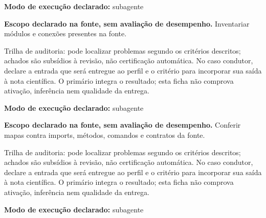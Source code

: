 \begin{arquitetura}
\textbf{Modo de execução declarado:} subagente
\end{arquitetura}


\begin{descricao}
\textbf{Escopo declarado na fonte, sem avaliação de desempenho.}
Inventariar módulos e conexões presentes na fonte.
\end{descricao}

\begin{funcao}
Trilha de auditoria: pode localizar problemas segundo os critérios descritos; achados são subsídios à revisão, não certificação automática. No caso condutor, declare a entrada que será entregue ao perfil e o critério para incorporar sua saída à nota científica. O primário integra o resultado; esta ficha não comprova ativação, inferência nem qualidade da entrega.
\end{funcao}

\begin{arquitetura}
\textbf{Modo de execução declarado:} subagente
\end{arquitetura}


\begin{descricao}
\textbf{Escopo declarado na fonte, sem avaliação de desempenho.}
Conferir mapas contra imports, métodos, comandos e contratos da fonte.
\end{descricao}

\begin{funcao}
Trilha de auditoria: pode localizar problemas segundo os critérios descritos; achados são subsídios à revisão, não certificação automática. No caso condutor, declare a entrada que será entregue ao perfil e o critério para incorporar sua saída à nota científica. O primário integra o resultado; esta ficha não comprova ativação, inferência nem qualidade da entrega.
\end{funcao}

\begin{arquitetura}
\textbf{Modo de execução declarado:} subagente
\end{arquitetura}

